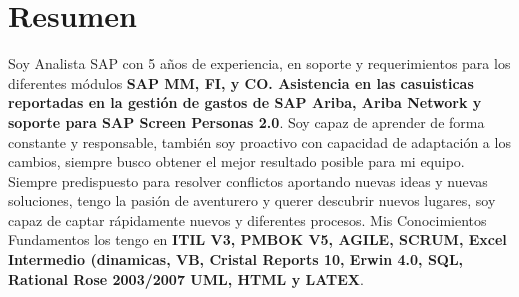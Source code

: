 \documentclass[espanol]{cv-style}     %
\begin{document}
\section{Resumen}
  \vspace{-0.2cm}
Soy Analista SAP con 5 años de experiencia, en soporte y requerimientos para los diferentes módulos \textbf{SAP MM, FI, y CO. Asistencia en las casuisticas reportadas en la gestión de gastos de SAP Ariba, Ariba Network y soporte para SAP Screen Personas 2.0}.
Soy capaz de aprender de forma constante y responsable, también soy proactivo con capacidad de adaptación a los cambios, siempre busco obtener el mejor resultado posible para mi equipo.
Siempre predispuesto para resolver conflictos aportando nuevas ideas y nuevas soluciones, tengo la pasión de aventurero y querer descubrir nuevos lugares, soy capaz de captar rápidamente nuevos y diferentes procesos. 
Mis Conocimientos Fundamentos los tengo en \textbf{ITIL V3, PMBOK V5, AGILE, SCRUM, Excel Intermedio (dinamicas, VB, Cristal Reports 10, Erwin 4.0, SQL, Rational Rose 2003/2007 UML, HTML y LATEX}.
\end{document}
